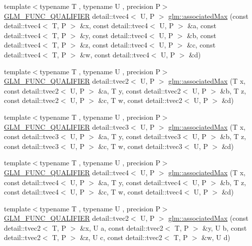 \begin{DoxyCompactItemize}
\item 
{\footnotesize template$<$typename T , typename U , precision P$>$ }\\\hyperlink{setup_8hpp_a33fdea6f91c5f834105f7415e2a64407}{G\+L\+M\+\_\+\+F\+U\+N\+C\+\_\+\+Q\+U\+A\+L\+I\+F\+I\+ER} detail\+::tvec4$<$ U, P $>$ \hyperlink{namespaceglm_aa9c28699144939e12f1b1261b1939688}{glm\+::associated\+Max} (const detail\+::tvec4$<$ T, P $>$ \&x, const detail\+::tvec4$<$ U, P $>$ \&a, const detail\+::tvec4$<$ T, P $>$ \&y, const detail\+::tvec4$<$ U, P $>$ \&b, const detail\+::tvec4$<$ T, P $>$ \&z, const detail\+::tvec4$<$ U, P $>$ \&c, const detail\+::tvec4$<$ T, P $>$ \&w, const detail\+::tvec4$<$ U, P $>$ \&d)
\item 
{\footnotesize template$<$typename T , typename U , precision P$>$ }\\\hyperlink{setup_8hpp_a33fdea6f91c5f834105f7415e2a64407}{G\+L\+M\+\_\+\+F\+U\+N\+C\+\_\+\+Q\+U\+A\+L\+I\+F\+I\+ER} detail\+::tvec2$<$ U, P $>$ \hyperlink{namespaceglm_aaa37fcc1597ced974a35c9765128c888}{glm\+::associated\+Max} (T x, const detail\+::tvec2$<$ U, P $>$ \&a, T y, const detail\+::tvec2$<$ U, P $>$ \&b, T z, const detail\+::tvec2$<$ U, P $>$ \&c, T w, const detail\+::tvec2$<$ U, P $>$ \&d)
\item 
{\footnotesize template$<$typename T , typename U , precision P$>$ }\\\hyperlink{setup_8hpp_a33fdea6f91c5f834105f7415e2a64407}{G\+L\+M\+\_\+\+F\+U\+N\+C\+\_\+\+Q\+U\+A\+L\+I\+F\+I\+ER} detail\+::tvec3$<$ U, P $>$ \hyperlink{namespaceglm_a92b6d5f6dedb0372fb0fb6fbff888671}{glm\+::associated\+Max} (T x, const detail\+::tvec3$<$ U, P $>$ \&a, T y, const detail\+::tvec3$<$ U, P $>$ \&b, T z, const detail\+::tvec3$<$ U, P $>$ \&c, T w, const detail\+::tvec3$<$ U, P $>$ \&d)
\item 
{\footnotesize template$<$typename T , typename U , precision P$>$ }\\\hyperlink{setup_8hpp_a33fdea6f91c5f834105f7415e2a64407}{G\+L\+M\+\_\+\+F\+U\+N\+C\+\_\+\+Q\+U\+A\+L\+I\+F\+I\+ER} detail\+::tvec4$<$ U, P $>$ \hyperlink{namespaceglm_ac1775bef23dce24ccc58b4d28ebedfe5}{glm\+::associated\+Max} (T x, const detail\+::tvec4$<$ U, P $>$ \&a, T y, const detail\+::tvec4$<$ U, P $>$ \&b, T z, const detail\+::tvec4$<$ U, P $>$ \&c, T w, const detail\+::tvec4$<$ U, P $>$ \&d)
\item 
{\footnotesize template$<$typename T , typename U , precision P$>$ }\\\hyperlink{setup_8hpp_a33fdea6f91c5f834105f7415e2a64407}{G\+L\+M\+\_\+\+F\+U\+N\+C\+\_\+\+Q\+U\+A\+L\+I\+F\+I\+ER} detail\+::tvec2$<$ U, P $>$ \hyperlink{namespaceglm_ac62eaf5209fc441ade50b87df43829c0}{glm\+::associated\+Max} (const detail\+::tvec2$<$ T, P $>$ \&x, U a, const detail\+::tvec2$<$ T, P $>$ \&y, U b, const detail\+::tvec2$<$ T, P $>$ \&z, U c, const detail\+::tvec2$<$ T, P $>$ \&w, U d)

\end{DoxyCompactItemize}
